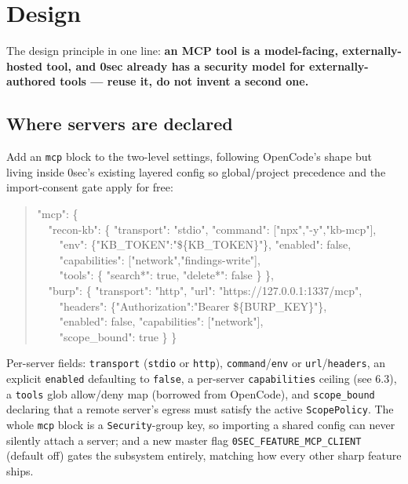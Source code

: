 \documentclass[11pt]{article}
\begin{document}
\section{Design}

The design principle in one line: \textbf{an MCP tool is a model-facing,
externally-hosted tool, and 0sec already has a security model for
externally-authored tools --- reuse it, do not invent a second one.}

\subsection{Where servers are declared}

Add an \texttt{mcp} block to the two-level settings, following OpenCode's shape
but living inside 0sec's existing layered config so global/project precedence and
the import-consent gate apply for free:

\begin{quote}
\ttfamily
"mcp": \{\\
\ \ "recon-kb": \{ "transport": "stdio", "command": ["npx","-y","kb-mcp"],\\
\ \ \ \ "env": \{"KB\_TOKEN":"\$\{KB\_TOKEN\}"\}, "enabled": false,\\
\ \ \ \ "capabilities": ["network","findings-write"],\\
\ \ \ \ "tools": \{ "search*": true, "delete*": false \} \},\\
\ \ "burp": \{ "transport": "http", "url": "https://127.0.0.1:1337/mcp",\\
\ \ \ \ "headers": \{"Authorization":"Bearer \$\{BURP\_KEY\}"\},\\
\ \ \ \ "enabled": false, "capabilities": ["network"],\\
\ \ \ \ "scope\_bound": true \} \}
\end{quote}

Per-server fields: \texttt{transport} (\texttt{stdio} or \texttt{http}),
\texttt{command}/\texttt{env} or \texttt{url}/\texttt{headers}, an explicit
\texttt{enabled} defaulting to \texttt{false}, a per-server \texttt{capabilities}
ceiling (see 6.3), a \texttt{tools} glob allow/deny map (borrowed from OpenCode),
and \texttt{scope\_bound} declaring that a remote server's egress must satisfy
the active \texttt{ScopePolicy}. The whole \texttt{mcp} block is a
\texttt{Security}-group key, so importing a shared config can never silently
attach a server; and a new master flag \texttt{0SEC\_FEATURE\_MCP\_CLIENT}
(default off) gates the subsystem entirely, matching how every other sharp
feature ships.
\end{document}
